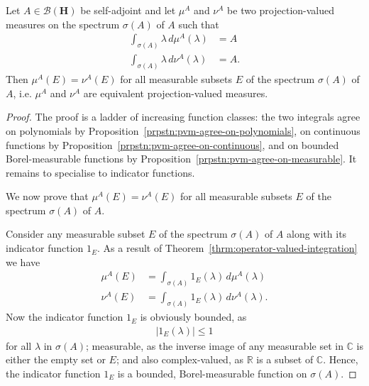\begin{theorem}
    \label{thrm:hall-prblm-8.3.4}
    \leanok
    Let $A \in \mathcal{B}(\mathbf{H})$ be self-adjoint and let $\mu^A$ and $\nu^A$ be two projection-valued measures on the spectrum $\sigma(A)$ of $A$ such that
    \begin{align}
        \int_{\sigma(A)} \lambda \, d\mu^A(\lambda) &= A \\
        \int_{\sigma(A)} \lambda \, d\nu^A(\lambda) &= A.
    \end{align}
    Then $\mu^A(E) = \nu^A(E)$ for all measurable subsets $E$ of the spectrum $\sigma(A)$ of $A$, i.e. $\mu^A$ and $\nu^A$ are equivalent projection-valued measures.
\end{theorem}
\begin{proof}
    \leanok
The proof is a ladder of increasing function classes: the two integrals agree on polynomials by Proposition~\ref{prpstn:pvm-agree-on-polynomials}, on continuous functions by Proposition~\ref{prpstn:pvm-agree-on-continuous}, and on bounded Borel-measurable functions by Proposition~\ref{prpstn:pvm-agree-on-measurable}. It remains to specialise to indicator functions.

We now prove that $\mu^A(E) = \nu^A(E)$ for all measurable subsets $E$ of the spectrum $\sigma(A)$ of $A$.

Consider any measurable subset $E$ of the spectrum $\sigma(A)$ of $A$ along with its indicator function $1_E$. As a result of Theorem~\ref{thrm:operator-valued-integration} we have
\begin{align}
    \mu^A(E) &= \int_{\sigma(A)} 1_E(\lambda) \, d\mu^A(\lambda) \\
    \nu^A(E) &= \int_{\sigma(A)} 1_E(\lambda) \, d\nu^A(\lambda). 
\end{align}
Now the indicator function $1_E$ is obviously bounded, as
\begin{align}
    \lvert 1_E(\lambda) \rvert \le 1
\end{align}
for all $\lambda$ in $\sigma(A)$; measurable, as the inverse image of any measurable set in $\mathbb{C}$ is either the empty set or $E$; and also complex-valued, as $\mathbb{R}$ is a subset of $\mathbb{C}$. Hence, the indicator function $1_E$ is a bounded, Borel-measurable function on $\sigma(A)$.


\end{proof}
